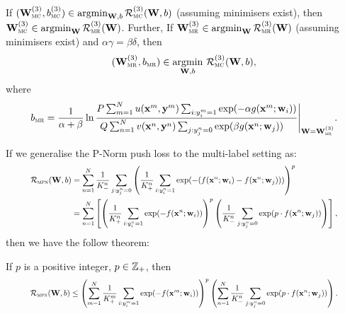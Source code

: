 \begin{theorem}
\label{theorem:mc2mr}
If $(\mathbf{W}_\textsc{mc}^{({3})}, b_\textsc{mc}^{({3})}) \in \operatorname*{argmin}_{\mathbf{W},b} \mathcal{R}_\textsc{mc}^{({3})}(\mathbf{W}, b)$ (assuming minimisers exist),
then $\mathbf{W}_\textsc{mc}^{({3})} \in \operatorname*{argmin}_{\mathbf{W}} \mathcal{R}_\textsc{mr}^{({3})}(\mathbf{W})$.
Further, If $\mathbf{W}_\textsc{mr}^{({3})} \in \operatorname*{argmin}_{\mathbf{W}} \mathcal{R}_\textsc{mr}^{({3})}(\mathbf{W})$ (assuming minimisers exist) and $\alpha \gamma = \beta \delta$,
then 
$$
(\mathbf{W}_\textsc{mr}^{({3})}, b_\textsc{mr}) \in \operatorname*{argmin}_{\mathbf{W},b} \, \mathcal{R}_\textsc{mc}^{({3})}(\mathbf{W}, b),
$$ 
where
\begin{equation*}
\resizebox{.9\linewidth}{!}{$
\displaystyle
b_\textsc{mr} = \frac{1}{\alpha + \beta} \ln 
      \frac{P \sum_{m=1}^N u(\x^m, \y^m) \sum_{i: y_i^m = 1} \exp(-\alpha g(\x^m; \w_i))}
           {Q \sum_{n=1}^N v(\x^n, \y^n) \sum_{j: y_j^n = 0} \exp( \beta  g(\x^n; \w_j)) \hspace{1em}} \Bigg|_{\W = \W_\textsc{mr}\pb{3}}.
$}
\end{equation*}
\end{theorem}


If we generalise the P-Norm push loss to the multi-label setting as:
\begin{equation}
\label{eq:pnorm-ml}
\resizebox{.9\linewidth}{!}{$
\displaystyle
\begin{aligned}
\RCal_\textsc{mpn}(\W, b) 
&= \sum_{n=1}^N \frac{1}{K_-^n} \sum_{j:y_j^n=0} \left( \frac{1}{K_+^n} \sum_{i:y_i^n=1} \exp(-(f(\x^n; \w_i) - f(\x^n; \w_j))) \right)^p \\
&= \sum_{n=1}^N \left[
   \left( \frac{1}{K_+^n} \sum_{i:y_i^n=1} \exp(-f(\x^n; \w_i)) \right)^p 
   \left( \frac{1}{K_-^n} \sum_{j:y_j^n=0} \exp(p \cdot f(\x^n; \w_j)) \right) \right],
\end{aligned}
$}
\end{equation}
then we have the follow theorem:
\begin{theorem}
\label{theorem:pnorm-ml-ub}
If $p$ is a positive integer, \ie $p \in \mathbb{Z}_+$, then 
\begin{equation}
\label{eq:pnorm-ml-ub}
\resizebox{.9\linewidth}{!}{$
\displaystyle
\RCal_\textsc{mpn}(\W, b) \le 
\left( \sum_{m=1}^N \frac{1}{K_+^m} \sum_{i:y_i^m=1} \exp(-f(\x^m; \w_i)) \right)^p 
\left( \sum_{n=1}^N \frac{1}{K_-^n} \sum_{j:y_j^n=0} \exp(p \cdot f(\x^n; \w_j)) \right).
$}
\end{equation}
\end{theorem}
